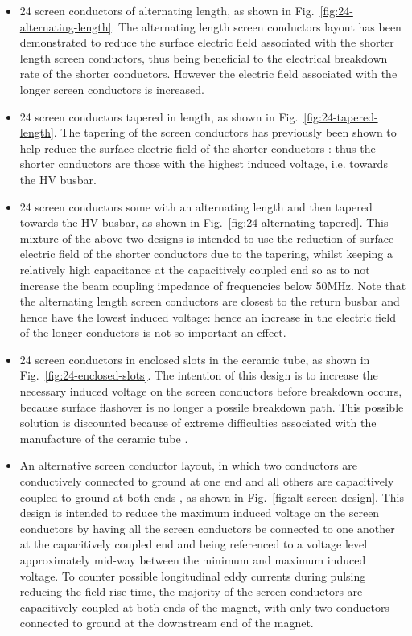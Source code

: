 \begin{itemize}
\item{24 screen conductors of alternating length, as shown in Fig.~\ref{fig:24-alternating-length}. The alternating length screen conductors layout has been demonstrated to reduce the surface electric field associated with the shorter length screen conductors, thus being beneficial to the electrical breakdown rate of the shorter conductors. However the electric field associated with the longer screen conductors is increased.}
\item{24 screen conductors tapered in length, as shown in Fig.~\ref{fig:24-tapered-length}. The tapering of the screen conductors has previously been shown to help reduce the surface electric field of the shorter conductors \cite{Barnes:improvBeamScreen}: thus the shorter conductors are those with the highest induced voltage, i.e. towards the HV busbar.}
\item{24 screen conductors some with an alternating length and then tapered towards the HV busbar, as shown in Fig.~\ref{fig:24-alternating-tapered}. This mixture of the above two designs is intended to use the reduction of surface electric field of the shorter conductors due to the tapering, whilst keeping a relatively high capacitance at the capacitively coupled end so as to not increase the beam coupling impedance of frequencies below 50MHz. Note that the alternating length screen conductors are closest to the return busbar and hence have the lowest induced voltage: hence an increase in the electric field of the longer conductors is not so important an effect.}
\item{24 screen conductors in enclosed slots in the ceramic tube, as shown in Fig.~\ref{fig:24-enclosed-slots}. The intention of this design is to increase the necessary induced voltage on the screen conductors before breakdown occurs, because surface flashover is no longer a possile breakdown path. This possible solution is discounted because of extreme difficulties associated with the manufacture of the ceramic tube \cite{Barnes:8thStratMeet}.}
\item{An alternative screen conductor layout, in which two conductors are conductively connected to ground at one end and all others are capacitively coupled to ground at both ends \cite{Barnes:mkiAlt}, as shown in Fig.~\ref{fig:alt-screen-design}. This design is intended to reduce the maximum induced voltage on the screen conductors by having all the screen conductors be connected to one another at the capacitively coupled end and being referenced to a voltage level approximately mid-way between the minimum and maximum induced voltage. To counter possible longitudinal eddy currents during pulsing reducing the field rise time, the majority of the screen conductors are capacitively coupled at both ends of the magnet, with only two conductors connected to ground at the downstream end of the magnet.}

\end{itemize}
